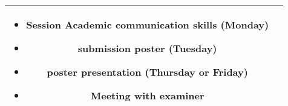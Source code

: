 \documentclass[english]{article}
\begin{document}
\begin{center}
\begin{longtable}[c]{ | c | c | }
\begin{minipage}{5in}
\begin{itemize}
        \item Session Academic communication skills (Monday)
        \item submission poster (Tuesday)
        \item poster presentation (Thursday or Friday)
        \item Meeting with examiner
    \end{itemize}
   \vskip 4pt
 \end{minipage}
 \\  
  \hline
\end{longtable}
\end{center}


\medskip
\printbibliography
\end{document}
